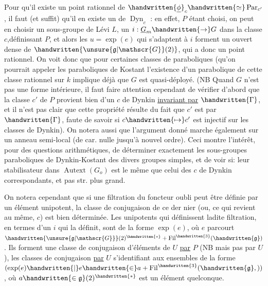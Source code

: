 Pour qu'il existe un point rationnel de  $\handwritten{\underline{\phi}}_c\handwritten{\simeq}\operatorname{Par}_{c'}$, il faut (et suffit) qu'il en existe un de $\operatorname{Dyn}_c$ : en effet, $P$ étant choisi,  on peut en choisir un  sous-groupe de Lévi $L$, un $i:\underline{G}_m\handwritten{\to}G$ dans la classe $c$,définissant $P$, et alors les $u=\exp(e)$ qui  s'adaptent à $i$ forment un ouvert dense de $\handwritten{\unsure{\mathfrak{g}|\mathscr{G}}(2)}$, qui  a donc un point rationnel. On voit donc que pour certaines classes de paraboliques (qu'on pourrait appeler les paraboliques de Kostant\unsure{)} l'existence d'un parabolique de cette classe rationnel sur $k$ implique déjà que $G$ est quasi-déployé. (NB Quand $G$ n'est pas une forme intérieure, il faut faire attention cependant de vérifier d'abord que la classe $c'$ de $P$ provient bien d'un $c$ de Dynkin \uline{invariant par} $\handwritten{\Gamma}$, et il n'est pas clair que cette propriété résulte du fait que $c'$ est  par $\handwritten{\Gamma}$, faute de savoir si $c\handwritten{\mapsto}c'$ est injectif sur les classes de Dynkin). \handwritten{(}On notera aussi que l'argument donné marche également sur un anneau semi-local (de car. nulle jusqu'à nouvel ordre).\handwritten{)}
Ceci montre l'intérêt, pour des questions arithmétiques, de déterminer exactement les sous-groupes parab\handwritten{\unsure{-}}oliques de Dynkin-Kostant des divers groupes simples, et de voir si: leur stabilisateur dans $\operatorname{Autext}(G_o)$ est le même que celui des $c$ de Dynkin correspondants, et pas str. plus grand.

On notera cependant que si une filtration du foncteur  oubli peut être définie par un élément unipotent, la classe de conjugaison de ce der%
nier (ou, ce qui revient au même, $c$) est bien déterminée. Les unipotents qui définissent ladite filtration, en termes d'un $i$ qui la définit, sont de la forme $\exp(e)$, où $e$ parcourt $\handwritten{\unsure{\mathfrak{g}|\mathscr{G}}}(2)^{\handwritten{*}}+\operatorname{Fil}^{\handwritten{3}}(\handwritten{\mathfrak{g}})$. Ils forment une classe de conjugaison d'éléments de $U$ \uline{par} $P$ (NB mais pas par $U$), les classes de conjugaison \uline{par} $U$ s'identifiant aux ensembles de la forme $(\exp(e)\handwritten{\mid}e\handwritten{\in}a+\operatorname{Fil}^{\handwritten{3}}(\handwritten{\mathfrak{g}},))$, où $a\handwritten{\in\mathfrak{g}}(2)^{\handwritten{*}}$ est un élément quelconque.

